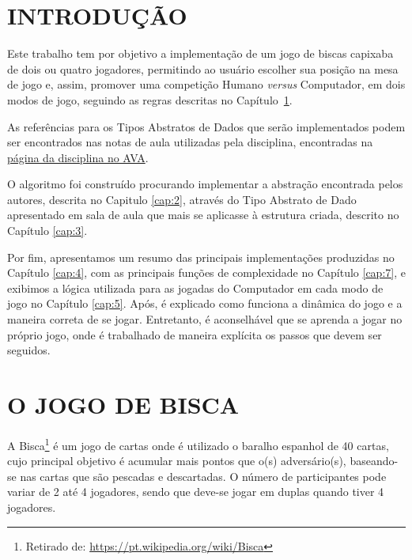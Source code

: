 \documentclass[12pt, oneside, a4paper, brazil]{abntex2}
\begin{document}
\imprimircapa

\imprimirfolhaderosto


\tableofcontents*


\chapter*{INTRODUÇÃO}
\textual

Este trabalho tem por objetivo a implementação de um jogo de biscas capixaba de dois ou quatro jogadores, permitindo ao usuário escolher sua posição na mesa de jogo e, assim, promover uma competição Humano \textit{versus} Computador, em dois modos de jogo, seguindo as regras descritas no Capítulo~\ref{cap:1}.

As referências para os Tipos Abstratos de Dados que serão implementados podem ser encontrados nas notas de aula utilizadas pela disciplina, encontradas na \href{https://ava.ufes.br/course/view.php?id=2447}{página da disciplina no AVA}.

O algoritmo foi construído procurando implementar a abstração encontrada pelos autores, descrita no Capitulo \ref{cap:2}, através do Tipo Abstrato de Dado apresentado em sala de aula que mais se aplicasse à estrutura criada, descrito no Capítulo \ref{cap:3}.

Por fim, apresentamos um resumo das principais implementações produzidas no Capítulo \ref{cap:4}, com as principais funções de complexidade no Capítulo \ref{cap:7}, e exibimos a lógica utilizada para as jogadas do Computador em cada modo de jogo no Capítulo \ref{cap:5}. Após, é explicado como funciona a dinâmica do jogo e a maneira correta de se jogar. Entretanto, é aconselhável que se aprenda a jogar no próprio jogo, onde é trabalhado de maneira explícita os passos que devem ser seguidos.

\chapter{O JOGO DE BISCA}\label{cap:1}

A Bisca\footnote{Retirado de: \url{https://pt.wikipedia.org/wiki/Bisca}} é um jogo de cartas onde é utilizado o baralho espanhol de 40 cartas, cujo principal objetivo é acumular mais pontos que o(s) adversário(s), baseando-se nas cartas que são pescadas e descartadas. O número de participantes pode variar de 2 até 4 jogadores, sendo que deve-se jogar em duplas quando tiver 4 jogadores.
\end{document}
